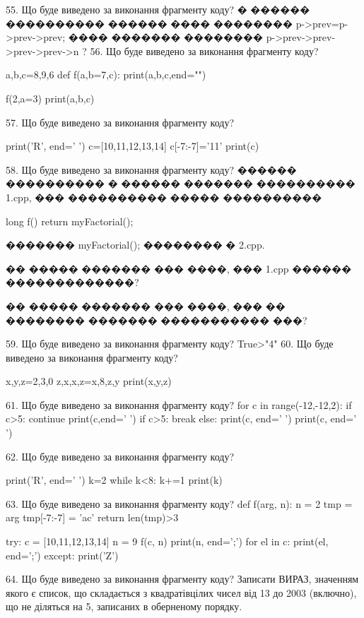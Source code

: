 \documentclass[11pt]{article}
\begin{document}
55. Що буде виведено за виконання фрагменту коду?
� ������ ���������� ������ ���� �������� p->prev=p->prev->prev;
���� ������� �������� p->prev->prev->prev->prev->n ?
56. Що буде виведено за виконання фрагменту коду?

a,b,c=8,9,6
def f(a,b=7,c):
    print(a,b,c,end="")

f(2,a=3)
print(a,b,c)


57. Що буде виведено за виконання фрагменту коду?

print('R', end=' ')
c=[10,11,12,13,14]
c[-7:-7]='11'
print(c)


58. Що буде виведено за виконання фрагменту коду?
������ ���������� � ������ ������� ���������� 1.cpp, ��� ���������� ����� ����������\par
long f(){ return myFactorial();}\par
������� myFactorial(); �������� � 2.cpp.\par
�� ����� ������� ��� ����, ��� 1.cpp ������ �������������?\par\vspace{1.5cm}
�� ����� ������� ��� ����, ��� �� �������� ������� ����������� ���?\par

59. Що буде виведено за виконання фрагменту коду?
True>"4"
60. Що буде виведено за виконання фрагменту коду?

x,y,z=2,3,0
z,x,x,z=x,8,z,y
print(x,y,z)

61. Що буде виведено за виконання фрагменту коду?
for c in range(-12,-12,2):
    if c>5:
        continue
        print(c,end=' ')
    if c>5:
        break
else:
    print(c, end=' ')
print(c, end=' ')

62. Що буде виведено за виконання фрагменту коду?

print('R', end=' ')
k=2
while k<8:
    k+=1
print(k)


63. Що буде виведено за виконання фрагменту коду?
def f(arg, n):
    n = 2
    tmp = arg
    tmp[-7:-7] = 'ac'
    return len(tmp)>3

try:
    c = [10,11,12,13,14]
    n = 9
    f(c, n)
    print(n, end=';')
    for el in c:
        print(el, end=';')
except:
    print('Z')

64. Що буде виведено за виконання фрагменту коду?
Записати ВИРАЗ, значенням якого є список, що складається з квадратівцілих чисел від 13 до 2003 (включно), що не діляться на 5, записаних в обернено\-му порядку.
\end{document}
